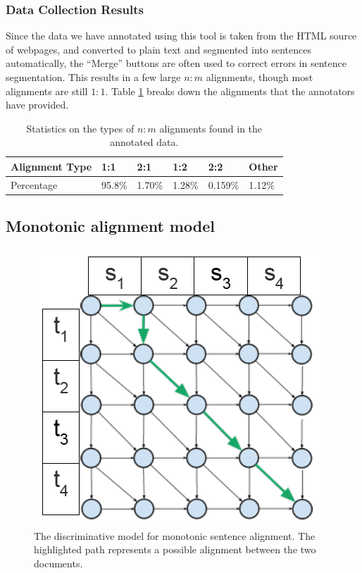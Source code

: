 \subsubsection{Data Collection Results}

Since the data we have annotated using this tool is taken from the HTML source
of webpages, and converted to plain text and segmented into sentences
automatically, the ``Merge'' buttons are often used to correct errors in
sentence segmentation. This results in a few large $n:m$ alignments, though most
alignments are still $1:1$. Table \ref{table:merge_stats} breaks down the
alignments that the annotators have provided.

\begin{table}[ht!]
\begin{center}
\begin{tabular}{|l||l|l|l|l|l|}
\hline
Alignment Type & 1:1 & 2:1 & 1:2 & 2:2 & Other\\
\hline
Percentage & 95.8\% & 1.70\% & 1.28\% & 0.159\% & 1.12\%\\
\hline
\end{tabular}
\end{center}
\caption{Statistics on the types of $n:m$ alignments found in the annotated
data.}
\label{table:merge_stats}
\end{table}

\subsection{Monotonic alignment model}

\begin{figure}
\begin{center}
\includegraphics[scale=0.5]{images/google_model.png}
\caption{The discriminative model for monotonic sentence alignment. The
highlighted path represents a possible alignment between the two documents.}
\label{fig:mono_disc}
\end{center}
\end{figure}

